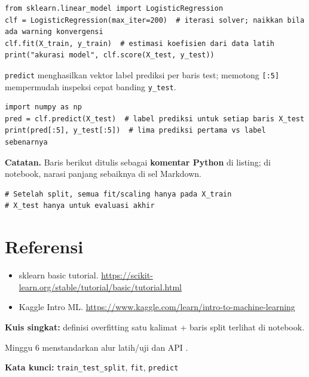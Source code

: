 \documentclass[../main.tex]{subfiles}
\begin{document}
\begin{lstlisting}[caption=LogisticRegression sederhana]
from sklearn.linear_model import LogisticRegression
clf = LogisticRegression(max_iter=200)  # iterasi solver; naikkan bila ada warning konvergensi
clf.fit(X_train, y_train)  # estimasi koefisien dari data latih
print("akurasi model", clf.score(X_test, y_test))
\end{lstlisting}

\MulaiPenjelasanKode \texttt{predict} menghasilkan vektor label prediksi per baris test; memotong \texttt{[:5]} mempermudah inspeksi cepat banding \texttt{y\_test}. \SelesaiPenjelasanKode

\begin{lstlisting}[caption=Prediksi dan bentuk array]
import numpy as np
pred = clf.predict(X_test)  # label prediksi untuk setiap baris X_test
print(pred[:5], y_test[:5])  # lima prediksi pertama vs label sebenarnya
\end{lstlisting}

\MulaiPenjelasanKode \textbf{Catatan.} Baris berikut ditulis sebagai \textbf{komentar Python} di listing; di notebook, narasi panjang sebaiknya di sel Markdown. \SelesaiPenjelasanKode

\begin{lstlisting}[caption=Catatan Markdown di notebook]
# Setelah split, semua fit/scaling hanya pada X_train
# X_test hanya untuk evaluasi akhir
\end{lstlisting}

\section{Referensi}

\begin{itemize}[leftmargin=*]
  \item sklearn basic tutorial. \url{https://scikit-learn.org/stable/tutorial/basic/tutorial.html}
  \item Kaggle Intro ML. \url{https://www.kaggle.com/learn/intro-to-machine-learning}
\end{itemize}

\begin{asesmen}
\textbf{Kuis singkat:} definisi overfitting satu kalimat + baris split terlihat di notebook.
\end{asesmen}

\begin{rangkuman}
Minggu 6 menstandarkan alur latih/uji dan API \sklearn{}.

\textbf{Kata kunci:} \texttt{train\_test\_split}, \texttt{fit}, \texttt{predict}
\end{rangkuman}
\end{document}
